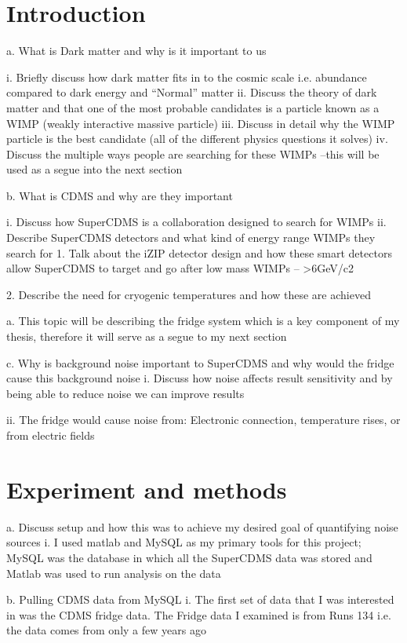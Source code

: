 \section{Introduction}
a.	What is Dark matter and why is it important to us

i.	Briefly discuss how dark matter fits in to the cosmic scale i.e. abundance compared to dark energy and “Normal” matter
ii.	Discuss the theory of dark matter and that one of the most probable candidates is a particle known as a WIMP (weakly interactive massive particle)
iii.	Discuss in detail why the WIMP particle is the best candidate (all of the different physics questions it solves)
iv.	Discuss the multiple ways people are searching for these WIMPs –this will be used as a segue into the next section

b.	What is CDMS and why are they important

i.	Discuss how SuperCDMS is a collaboration designed to search for WIMPs
ii.	Describe SuperCDMS detectors and what kind of energy range WIMPs they search for 
1.	Talk about the iZIP detector design and how these smart detectors allow SuperCDMS to target and go after low mass WIMPs –   >6GeV/c2  

2.	Describe the need for cryogenic temperatures and how these are achieved

a.	This topic will be describing the fridge system which is a key component of my thesis, therefore it will serve as a segue to my next section 

c.	Why is background noise important to SuperCDMS and why would the fridge cause this background noise
i.	Discuss how noise affects result sensitivity and by being able to reduce noise we can improve results 

ii.	The fridge would cause noise from: Electronic connection, temperature rises, or from electric fields

\section{Experiment and methods} 

a.	Discuss setup and how this was to achieve my desired goal of quantifying noise sources
i.	I used matlab and MySQL as my primary tools for this project; MySQL was the database in which all the SuperCDMS data was stored and Matlab was used to run analysis on the data

b.	Pulling CDMS data from MySQL
i.	The first set of data that I was interested in was the CDMS fridge data. The Fridge data I examined is from Runs 134 i.e. the data comes from only a few years ago

